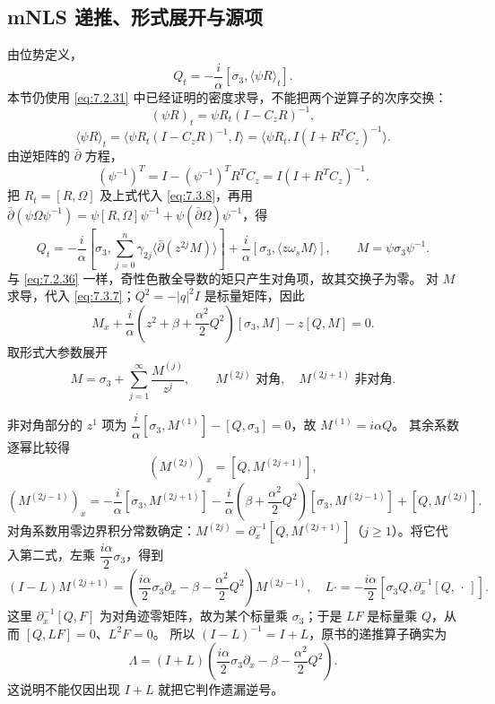 \documentclass[lang=cn,scheme=chinese,mode=simple,device=normal,color=blue,math=cm,thmcnt=section,12pt]{elegantbook}
\newcommand{\eqq}[2]{\tag{#1}\label{eq:#1}#2}
\begin{document}
\subsection{mNLS 递推、形式展开与源项}
由位势定义，
\begin{equation}
\eqq{7.3.8}{Q_t=-\dfrac{i}{\alpha}[\sigma_3,\langle\psi R\rangle_t].}
\end{equation}
本节仍使用 \eqref{eq:7.2.31} 中已经证明的密度求导，不能把两个逆算子的次序交换：
\begin{equation}
\eqq{7.3.9}{(\psi R)_t=\psi R_t(I-C_zR)^{-1},}
\end{equation}
\begin{equation}
\eqq{7.3.10}{\langle\psi R\rangle_t=\langle\psi R_t(I-C_zR)^{-1},I\rangle
=\langle\psi R_t,I(I+R^TC_z)^{-1}\rangle.}
\end{equation}
由逆矩阵的 $\bar\partial$ 方程，
\begin{equation}
\eqq{7.3.11}{(\psi^{-1})^T=I-(\psi^{-1})^TR^TC_z=I(I+R^TC_z)^{-1}.}
\end{equation}
把 $R_t=[R,\Omega]$ 及上式代入 \eqref{eq:7.3.8}，再用
$\bar\partial(\psi\Omega\psi^{-1})=\psi[R,\Omega]\psi^{-1}+\psi(\bar\partial\Omega)\psi^{-1}$，得
\begin{equation}
\eqq{7.3.12}{Q_t=-\dfrac{i}{\alpha}\left[\sigma_3,\sum\limits_{j=0}^n\gamma_{2j}\langle\bar\partial(z^{2j}M)\rangle\right]
+\dfrac{i}{\alpha}[\sigma_3,\langle z\omega_sM\rangle],\qquad M=\psi\sigma_3\psi^{-1}.}
\end{equation}
与 \eqref{eq:7.2.36} 一样，奇性色散全导数的矩只产生对角项，故其交换子为零。
对 $M$ 求导，代入 \eqref{eq:7.3.7}；$Q^2=-|q|^2I$ 是标量矩阵，因此
\begin{equation}
\eqq{7.3.13}{M_x+\dfrac{i}{\alpha}\left(z^2+\beta+\dfrac{\alpha^2}{2}Q^2\right)[\sigma_3,M]-z[Q,M]=0.}
\end{equation}
取形式大参数展开
\begin{equation}
\eqq{7.3.14}{M=\sigma_3+\sum\limits_{j=1}^{\infty}\dfrac{M^{(j)}}{z^j},\qquad
M^{(2j)}\text{ 对角},\quad M^{(2j+1)}\text{ 非对角}.}
\end{equation}
\begin{callout}[计算：比较各次幂并解出递推算子]
非对角部分的 $z^1$ 项为
$\dfrac{i}{\alpha}[\sigma_3,M^{(1)}]-[Q,\sigma_3]=0$，故 $M^{(1)}=i\alpha Q$。
其余系数逐幂比较得
\[
(M^{(2j)})_x=[Q,M^{(2j+1)}],
\]
\[
(M^{(2j-1)})_x=-\dfrac{i}{\alpha}[\sigma_3,M^{(2j+1)}]
-\dfrac{i}{\alpha}\left(\beta+\dfrac{\alpha^2}{2}Q^2\right)[\sigma_3,M^{(2j-1)}]
+[Q,M^{(2j)}].
\]
对角系数用零边界积分常数确定：$M^{(2j)}=\partial_x^{-1}[Q,M^{(2j+1)}]$（$j\ge1$）。将它代入第二式，左乘 $\dfrac{i\alpha}{2}\sigma_3$，得到
\[
(I-L)M^{(2j+1)}=\left(\dfrac{i\alpha}{2}\sigma_3\partial_x-\beta-\dfrac{\alpha^2}{2}Q^2\right)M^{(2j-1)},
\quad L\cdot=-\dfrac{i\alpha}{2}[\sigma_3Q,\partial_x^{-1}[Q,\,\cdot\,]].
\]
这里 $\partial_x^{-1}[Q,F]$ 为对角迹零矩阵，故为某个标量乘 $\sigma_3$；于是 $LF$ 是标量乘 $Q$，从而 $[Q,LF]=0$、$L^2F=0$。
所以 $(I-L)^{-1}=I+L$，原书的递推算子确实为
\[
\Lambda=(I+L)\left(\dfrac{i\alpha}{2}\sigma_3\partial_x-\beta-\dfrac{\alpha^2}{2}Q^2\right).
\]
这说明不能仅因出现 $I+L$ 就把它判作遗漏逆号。
\end{callout}
\end{document}
